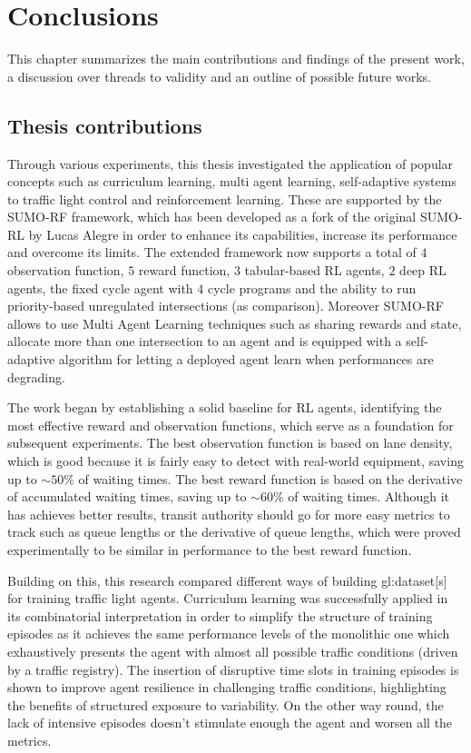 \chapter{Conclusions}
\label{chapter:conclusions}

This chapter summarizes the main contributions and findings of the present work, a discussion over threads to validity and an outline of possible future works.

\section{Thesis contributions}

Through various experiments, this thesis investigated the application of popular concepts such as curriculum learning, multi agent learning, self-adaptive systems to traffic light control and reinforcement learning.
These are supported by the SUMO-RF framework, which has been developed as a fork of the original SUMO-RL by Lucas Alegre in order to enhance its capabilities, increase its performance and overcome its limits.
The extended framework now supports a total of $4$ observation function, $5$ reward function, $3$ tabular-based RL agents, $2$ deep RL agents, the fixed cycle agent with $4$ cycle programs and the ability to run priority-based unregulated intersections (as comparison).
Moreover SUMO-RF allows to use Multi Agent Learning techniques such as sharing rewards and state, allocate more than one intersection to an agent and is equipped with a self-adaptive algorithm for letting a deployed agent learn when performances are degrading.

The work began by establishing a solid baseline for RL agents, identifying the most effective reward and observation functions, which serve as a foundation for subsequent experiments.
The best observation function is based on lane density, which is good because it is fairly easy to detect with real-world equipment, saving up to $\sim 50\%$ of waiting times.
The best reward function is based on the derivative of accumulated waiting times, saving up to $\sim 60\%$ of waiting times.
Although it has achieves better results, transit authority should go for more easy metrics to track such as queue lengths or the derivative of queue lengths, which were proved experimentally to be similar in performance to the best reward function.

Building on this, this research compared different ways of building \gls{gl:dataset}[s] for training traffic light agents.
Curriculum learning was successfully applied in its combinatorial interpretation in order to simplify the structure of training episodes as it achieves the same performance levels of the monolithic one which exhaustively presents the agent with almost all possible traffic conditions (driven by a traffic registry).
The insertion of disruptive time slots in training episodes is shown to improve agent resilience in challenging traffic conditions, highlighting the benefits of structured exposure to variability.
On the other way round, the lack of intensive episodes doesn't stimulate enough the agent and worsen all the metrics.

